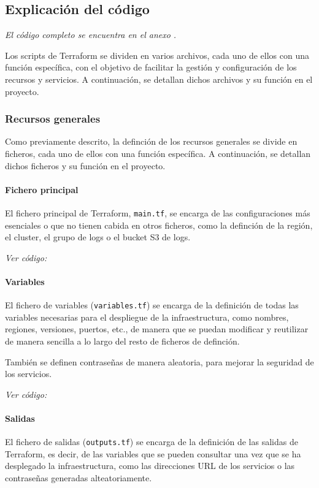 \newpage{}
\subsection{Explicación del código}\label{sec:impl_configuracion}
\emph{El código completo se encuentra en el anexo .}

Los scripts de Terraform se dividen en varios archivos, cada uno de ellos con
una función específica, con el objetivo de facilitar la gestión y configuración
de los recursos y servicios. A continuación, se detallan dichos archivos y su
función en el proyecto.


\subsubsection{Recursos generales}
Como previamente descrito, la definción de los recursos generales se divide en
ficheros, cada uno de ellos con una función específica. A continuación, se
detallan dichos ficheros y su función en el proyecto.

\paragraph{Fichero principal}
El fichero principal de Terraform, \texttt{main.tf}, se encarga de las
configuraciones más esenciales o que no tienen cabida en otros ficheros, como
la definción de la región, el cluster, el grupo de logs o el bucket S3 de logs.

\textit{Ver código: }


\paragraph{Variables}
El fichero de variables (\texttt{variables.tf}) se encarga de la definición de
todas las variables necesarias para el despliegue de la infraestructura, como
nombres, regiones, versiones, puertos, etc., de manera que se puedan modificar y
reutilizar de manera sencilla a lo largo del resto de ficheros de definción.

También se definen contraseñas de manera aleatoria, para mejorar la seguridad
de los servicios.

\textit{Ver código: }


\newpage{}
\paragraph{Salidas}
El fichero de salidas (\texttt{outputs.tf}) se encarga de la definición de las
salidas de Terraform, es decir, de las variables que se pueden consultar una vez
que se ha desplegado la infraestructura, como las direcciones URL de los servicios
o las contraseñas generadas alteatoriamente.

